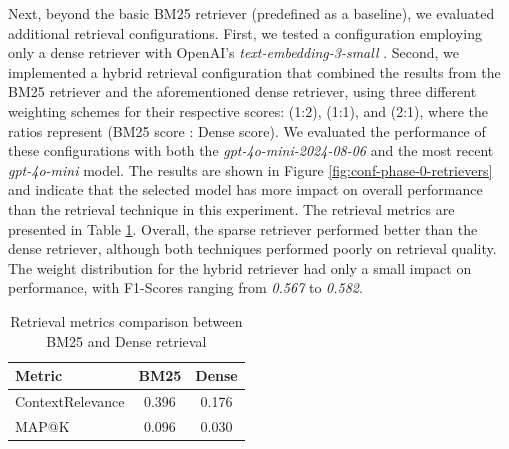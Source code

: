   Next, beyond the basic BM25 retriever (predefined as a baseline), we evaluated additional retrieval configurations. First, we tested a configuration employing only a dense retriever with OpenAI's \textit{text-embedding-3-small} \cite{OpenAI_2022}. Second, we implemented a hybrid retrieval configuration that combined the results from the BM25 retriever and the aforementioned dense retriever, using three different weighting schemes for their respective scores: (1:2), (1:1), and (2:1), where the ratios represent (BM25 score : Dense score). We evaluated the performance of these configurations with both the \textit{gpt-4o-mini-2024-08-06} and the most recent \textit{gpt-4o-mini} model. The results are shown in Figure \ref{fig:conf-phase-0-retrievers} and indicate that the selected model has more impact on overall performance than the retrieval technique in this experiment. The retrieval metrics are presented in Table \ref{tab:retrieval_metrics}. Overall, the sparse retriever performed better than the dense retriever, although both techniques performed poorly on retrieval quality. The weight distribution for the hybrid retriever had only a small impact on performance, with F1-Scores ranging from \textit{0.567} to \textit{0.582}.

\begin{table}[!ht]
    \centering
    \begin{tabular}{|l|c|c|}
        \hline
        \textbf{Metric} & \textbf{BM25} & \textbf{Dense} \\
        \hline
        ContextRelevance & 0.396 & 0.176 \\
        MAP@K & 0.096 & 0.030 \\
        \hline
    \end{tabular}
    \caption{Retrieval metrics comparison between BM25 and Dense retrieval}
    \label{tab:retrieval_metrics}
\end{table}

